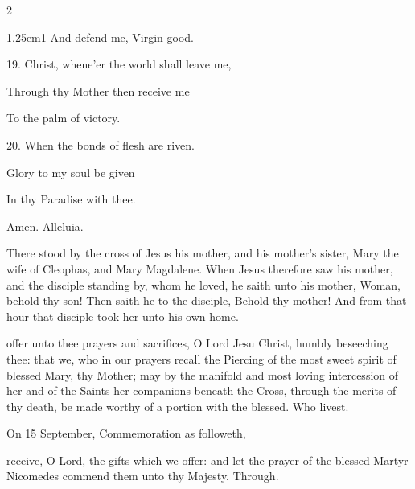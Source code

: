 \begin{multicols}{2}
\begin{hangparas}{1.25em}{1}
And defend me, Virgin good.\\

\vspace{-0.5\baselineskip}

19. Christ, whene'er the world shall leave me,

Through thy Mother then receive me

To the palm of victory.\\

\vspace{-0.5\baselineskip}

20. When the bonds of flesh are riven.

Glory to my soul be given

In thy Paradise with thee.

Amen. Alleluia.
\end{hangparas}
\end{multicols}
 There stood by the cross of Jesus his mother, and his mother's sister, Mary the wife of Cleophas, and Mary Magdalene. When Jesus therefore saw his mother, and the disciple standing by, whom he loved, he saith unto his mother, Woman, behold thy son! Then saith he to the disciple, Behold thy mother! And from that hour that disciple took her unto his own home.


\secret
{} offer unto thee prayers and sacrifices, O Lord Jesu Christ, humbly beseeching thee: that we, who in our prayers recall the Piercing of the most sweet spirit of blessed Mary, thy Mother; may by the manifold and most loving intercession of her and of the Saints her companions beneath the Cross, through the merits of thy death, be made worthy of a portion with the blessed. Who livest.

\begin{rubric}
	 On 15 September, Commemoration  as followeth,
\end{rubric}
 receive, O Lord, the gifts which we offer: and let the prayer of the blessed Martyr Nicomedes commend them unto thy Majesty. Through.


